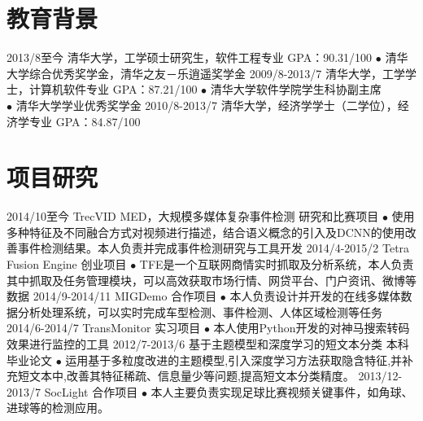 \documentclass[]{friggeri-cv}
\begin{document}

\section{教育背景}

\begin{entrylist}
  \entry
    {2013/8至今}
    {清华大学，工学硕士研究生，软件工程专业}
    {GPA：90.31/100}
    {
    $\bullet$ 清华大学综合优秀奖学金，清华之友－乐逍遥奖学金
    }
  \entry
    {2009/8-2013/7}
    {清华大学，工学学士，计算机软件专业}
    {GPA：87.21/100}
    {
    $\bullet$ 清华大学软件学院学生科协副主席\\
    $\bullet$ 清华大学学业优秀奖学金
    }
  \entry
    {2010/8-2013/7}
    {清华大学，经济学学士（二学位），经济学专业}
    {GPA：84.87/100}
    {}
\end{entrylist}

\section{项目研究}

\begin{entrylist}
  \entry
    {2014/10至今}
    {TrecVID MED，大规模多媒体复杂事件检测}
    {研究和比赛项目}
    {$\bullet$ 使用多种特征及不同融合方式对视频进行描述，结合语义概念的引入及DCNN的使用改善事件检测结果。本人负责并完成事件检测研究与工具开发}
  \entry
    {2014/4-2015/2}
    {Tetra Fusion Engine}
    {创业项目}
    {$\bullet$ TFE是一个互联网商情实时抓取及分析系统，本人负责其中抓取及任务管理模块，可以高效获取市场行情、网贷平台、门户资讯、微博等数据}
  \entry
    {2014/9-2014/11}
    {MIGDemo}
    {合作项目}
    {$\bullet$ 本人负责设计并开发的在线多媒体数据分析处理系统，可以实时完成车型检测、事件检测、人体区域检测等任务}
  \entry
    {2014/6-2014/7}
    {TransMonitor}
    {实习项目}
    {$\bullet$ 本人使用Python开发的对神马搜索转码效果进行监控的工具}
  \entry
    {2012/7-2013/6}
    {基于主题模型和深度学习的短文本分类}
    {本科毕业论文}
    {$\bullet$ 运用基于多粒度改进的主题模型,引入深度学习方法获取隐含特征,并补充短文本中,改善其特征稀疏、信息量少等问题,提高短文本分类精度。}
  \entry
    {2013/12-2013/7}
    {SocLight}
    {合作项目}
    {$\bullet$ 本人主要负责实现足球比赛视频关键事件，如角球、进球等的检测应用。}
\end{entrylist}

\end{document}
